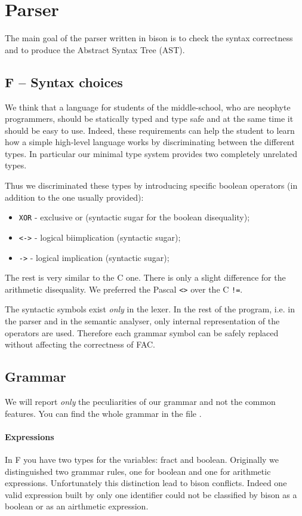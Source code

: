 \section{Parser}
\label{sec:parser}
The main goal of the parser written in bison is to check the
syntax correctness and to produce the Abstract Syntax Tree (AST).

\subsection{F -- Syntax choices}
We think that a language for students of the middle-school,
who are neophyte programmers, should be statically typed and type safe and
at the same time it should be easy to use. 
Indeed, these requirements can help the student to learn how a simple 
high-level language works by discriminating between the different types.
In particular our minimal type system provides two completely unrelated types.


Thus we discriminated these types by introducing specific boolean
operators (in addition to the one usually provided):
\begin{itemize}
	\item \verb|XOR| - exclusive or (syntactic sugar for the boolean disequality);
	\item \verb|<->| - logical biimplication (syntactic sugar);
	\item \verb|->| - logical implication (syntactic sugar);
\end{itemize}

The rest is very similar to the C one. There is only a slight difference
for the arithmetic disequality. We preferred the Pascal \verb|<>| over 
the C \verb|!=|.

The syntactic symbols exist \emph{only} in the lexer. In the
rest of the program, i.e. in the parser and in the semantic analyser, only
internal representation of the operators are used. Therefore each grammar
symbol can be safely replaced without affecting the correctness of FAC.

\subsection{Grammar}
We will report \emph{only} the peculiarities of our grammar and not the common 
features. You can find the whole grammar
in the file .

\paragraph{Expressions}
In F you have two types for the variables: fract and boolean.
Originally we distinguished two grammar rules, one for boolean and 
one for arithmetic expressions. Unfortunately this distinction
lead to bison conflicts. 
Indeed one valid expression built by only one identifier could not be 
classified by bison as a boolean or as an airthmetic expression.


